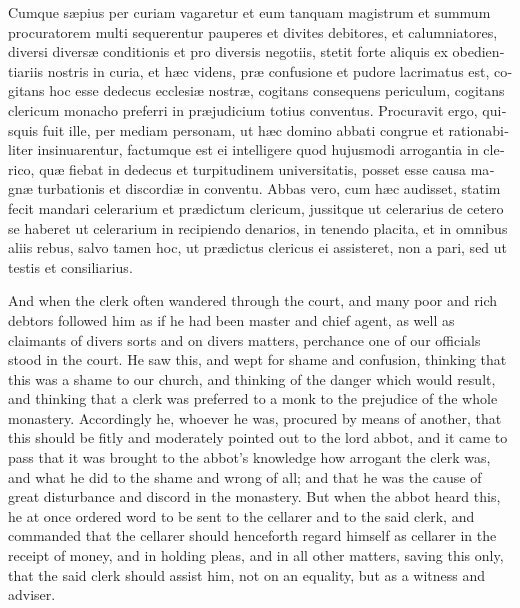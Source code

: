\documentclass[10pt]{book}
\begin{document}
\begin{paracol}{2}
\switchcolumn*

\begin{otherlanguage}{latin}
Cumque s\ae{}pius per curiam vagaretur et eum tanquam magistrum et summum procuratorem multi sequerentur pauperes et divites debitores, et calumniatores, diversi divers\ae{} conditionis et pro diversis negotiis, stetit forte aliquis ex obedientiariis nostris in curia, et h\ae{}c videns, pr\ae{} confusione et pudore lacrimatus est, cogitans hoc esse dedecus ecclesi\ae{} nostr\ae{}, cogitans consequens periculum, cogitans clericum monacho preferri in pr\ae{}judicium totius conventus. Procuravit ergo, quisquis fuit ille, per mediam personam, ut h\ae{}c domino abbati congrue et rationabiliter insinuarentur, factumque est ei intelligere quod hujusmodi arrogantia in clerico, qu\ae{} fiebat in dedecus et turpitudinem universitatis, posset esse causa magn\ae{} turbationis et discordi\ae{} in conventu. Abbas vero, cum h\ae{}c audisset, statim fecit mandari celerarium et pr\ae{}dictum clericum, jussitque ut celerarius de cetero se haberet ut celerarium in recipiendo denarios, in tenendo placita, et in omnibus aliis rebus, salvo tamen hoc, ut pr\ae{}dictus clericus ei assisteret, non a pari, sed ut testis et consiliarius.
\end{otherlanguage}

\switchcolumn

And when the clerk often wandered through the court, and many poor and rich debtors followed him as if he had been master and chief agent, as well as claimants of divers sorts and on divers matters, perchance one of our officials stood in the court. He saw this, and wept for shame and confusion, thinking that this was a shame to our church, and thinking of the danger which would result, and thinking that a clerk was preferred to a monk to the prejudice of the whole monastery. Accordingly he, whoever he was, procured by means of another, that this should be fitly and moderately pointed out to the lord abbot, and it came to pass that it was brought to the abbot's knowledge how arrogant the clerk was, and what he did to the shame and wrong of all; and that he was the cause of great disturbance and discord in the monastery. But when the abbot heard this, he at once ordered word to be sent to the cellarer and to the said clerk, and commanded that the cellarer should henceforth regard himself as cellarer in the receipt of money, and in holding pleas, and in all other matters, saving this only, that the said clerk should assist him, not on an equality, but as a witness and adviser.


\end{paracol}
\end{document}
